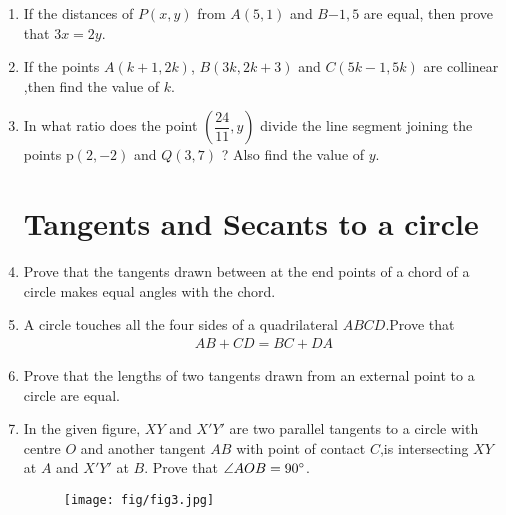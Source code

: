 \documentclass{article}
\providecommand{\brak}[1]{\ensuremath{\left(#1\right)}}
\begin{document}
\begin{enumerate}
																																						        \item If the distances of $P\brak{x,y}$ from $A\brak{5,1}$ and $B{-1,5}$ are equal, then prove that $3x = 2y$.

																																								    \item If the points $A\brak{k + 1, 2k}$, $B\brak{3k, 2k + 3}$ and $C\brak{5k - 1, 5k}$ are collinear ,then find the value of $k$.

																																									        \item In what ratio does the point $\brak{\dfrac{24}{11},y}$ divide the line segment joining the points p$\brak{2,-2}$ and $Q\brak{3,7}$ ? Also find the value of $y$.
																																											    
																																											\section{Tangents and Secants to a circle}

																																											    \item Prove that the tangents drawn between at the end points of a chord of a circle makes equal angles with the chord.
																																												        
																																												        \item A circle touches all the four sides of a quadrilateral $ABCD$.Prove that 
																																														    \begin{align*}
																																															            AB + CD = BC + DA
																																																        \end{align*}

																																																	    \item Prove that the lengths of two tangents drawn from an external point to a circle are equal.
																																																		            
																																																		        \item In the given figure, $XY$ and $X'Y'$ are two parallel tangents to a circle with centre $O$ and another tangent $AB$ with point of contact $C$,is intersecting $XY$ at $A$ and $X'Y'$ at $B$. Prove that $\angle AOB = 90\degree$.
																																																				    \begin{figure}[h]
																																																					            \centering
																																																						            \texttt{[image: fig/fig3.jpg]}
																																																							        \end{figure}
																																																								    

\end{enumerate}
\end{document}
